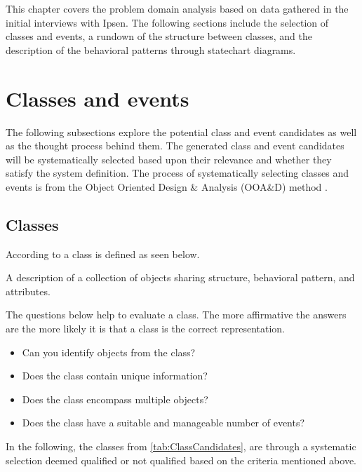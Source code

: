 This chapter covers the problem domain analysis based on data gathered in the initial interviews with Ipsen.
The following sections include the selection of classes and events, a rundown of the structure between classes, and the description of the behavioral patterns through statechart diagrams.

\section{Classes and events}\label{sec:ClassEvent}
The following subsections explore the potential class and event candidates as well as the thought process behind them.
The generated class and event candidates will be systematically selected based upon their relevance and whether they satisfy the system definition.
The process of systematically selecting classes and events is from the Object Oriented Design \& Analysis (OOA\&D) method \cite{Rod-Aalborg}.

\subsection{Classes} \label{sec:Classes}
According to  \citep[p.~55]{Rod-Aalborg} a class is defined as seen below.
\begin{defn}\label{defn:class}
	A description of a collection of objects sharing structure, behavioral pattern, and attributes.
\end{defn}

The questions below help to evaluate a class. The more affirmative the answers are the more likely it is that a class is the correct representation. \citep[p.~62]{Rod-Aalborg}
\begin{itemize}
	\item Can you identify objects from the class?
	\item Does the class contain unique information?
	\item Does the class encompass multiple objects?
	\item Does the class have a suitable and manageable number of events?
\end{itemize}

In the following, the classes from \cref{tab:ClassCandidates}, are through a systematic selection deemed qualified or not qualified based on the criteria mentioned above.

